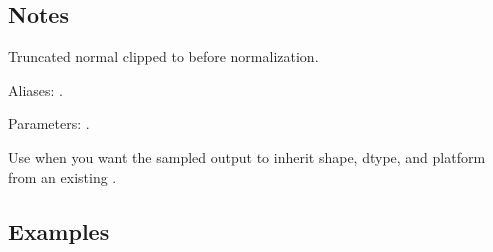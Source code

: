\documentclass[letterpaper,10pt,english]{sphinxmanual}
\begin{document}
\subsection{Notes}
\label{\detokenize{distribution_catalog:id92}}
\sphinxAtStartPar
Truncated normal clipped to \sphinxcode{\sphinxupquote{{[}a, b{]}}} before normalization.

\sphinxAtStartPar
Aliases: .

\sphinxAtStartPar
Parameters: .

\sphinxAtStartPar
Use  when you want the sampled output to inherit shape, dtype, and platform from an existing .


\subsection{Examples}
\label{\detokenize{distribution_catalog:id93}}
\end{document}
